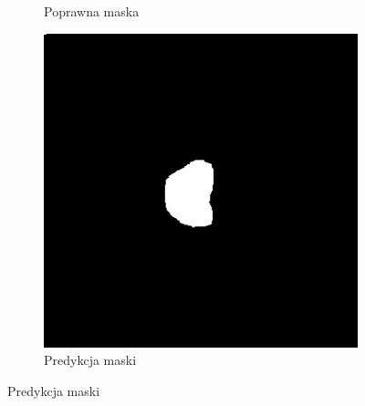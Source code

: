 \documentclass[a4paper,11pt,twoside]{report}
\theoremstyle{definition}
\begin{document}
\begin{figure}[htb]
\begin{subfigure}{0.25\textwidth}
		\caption{Poprawna maska}
		\label{fig:2}
	\end{subfigure}\hfil %
	\begin{subfigure}{0.25\textwidth}
		\includegraphics[width=\linewidth]{segmentation/pred_mask_1.png}
		\caption{Predykcja maski}
		\label{fig:3}
	\end{subfigure}
	

\end{figure}
\end{document}
